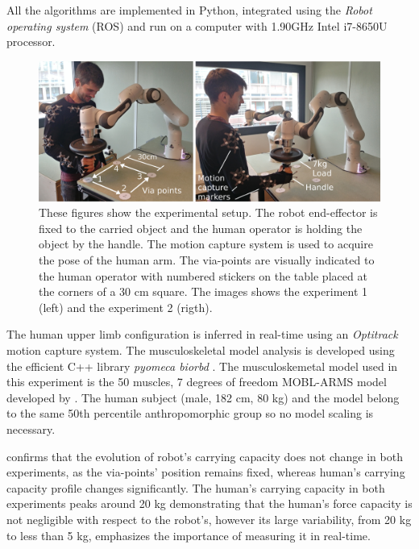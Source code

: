 All the algorithms are implemented in Python, integrated using the \textit{Robot operating system} (ROS) and run on a computer with 1.90GHz Intel i7-8650U processor. 

\begin{figure}[!t]
    \centering
    \includegraphics[width=\linewidth]{Papers/images/both_pose_explanation.jpg}
    \caption{{These figures show the experimental setup. The robot end-effector is fixed to the carried object and the human operator is holding the object by the handle. The motion capture system is used to acquire the pose of the human arm. The via-points are visually indicated to the human operator with numbered stickers on the table placed at the corners of a 30 cm square. The images shows the experiment 1 (left) and the experiment 2 (rigth).}}
    \label{fig:experiment}
\end{figure}

The human upper limb configuration is inferred in real-time using an \textit{Optitrack} motion capture system. The musculoskeletal model analysis is developed using the efficient C++ library \textit{pyomeca biorbd} \cite{Michaud2021}. The musculoskemetal model used in this experiment is the 50 muscles, 7 degrees of freedom MOBL-ARMS model \cite{saul2015benchmarking}  {developed by \citet{holzbaur2005model}. The human subject (male, 182 cm, 80 kg) and the model belong to the same 50th percentile anthropomorphic group \cite{gordon1989anthropometric} so no model scaling \cite{correa20112782} is necessary.}

 confirms that the evolution of robot's carrying capacity does not change in both experiments, as the via-points' position remains fixed, {whereas human's carrying capacity profile changes significantly}. The human's carrying capacity in both experiments peaks around 20 kg demonstrating that the human's force capacity is not negligible with respect to the robot's, however its large variability, from 20 kg to less than 5 kg, emphasizes the importance of measuring it in real-time.    

